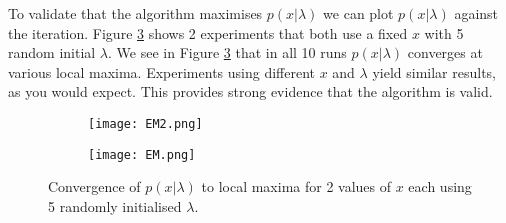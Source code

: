 To validate that the algorithm maximises $p(x|\lambda)$ we can plot $p(x|\lambda)$ against the iteration. Figure \ref{fig:em} shows 2 experiments that both use a fixed $x$ with 5 random initial $\lambda$. We see in Figure \ref{fig:em} that in all 10 runs $p(x|\lambda)$ converges at various local maxima. Experiments using different $x$ and $\lambda$ yield similar results, as you would expect. This provides strong evidence that the algorithm is valid.

\begin{figure}[h!]
    \begin{center}
    \begin{subfigure}{.5\textwidth}
        \begin{center}
    \texttt{[image: EM2.png]}
    \caption{}
    \label{fig:em1}
    \end{center}
    \end{subfigure}%
    \begin{subfigure}{.5\textwidth}
        \begin{center}
        \texttt{[image: EM.png]}
        \caption{}
        \label{fig:em2}
    \end{center}
        \end{subfigure}%
        \caption{Convergence of $p(x|\lambda)$ to local maxima for 2 values of $x$ each using 5 randomly initialised $\lambda$.}
    \label{fig:em}
    \end{center}
    \end{figure}